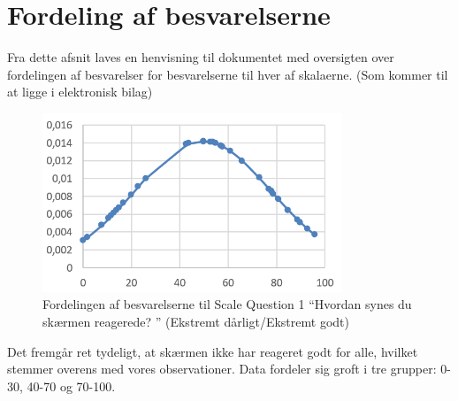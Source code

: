 \section{Fordeling af besvarelserne}
\label{TestAfSkalaFordelingAfBesvarelserne}
%
Fra dette afsnit laves en henvisning til dokumentet med oversigten over fordelingen af besvarelser for besvarelserne til hver af skalaerne. (Som kommer til at ligge i elektronisk bilag)
%
\begin{figure}[H]
\centering
\includegraphics[width = 0.8\textwidth]{Figure/DatabehandlingSkalaer/FordelingSkala1} 
\caption{Fordelingen af besvarelserne til Scale Question 1 ``Hvordan synes du skærmen reagerede? '' (Ekstremt dårligt/Ekstremt godt)}
\label{fig:FordelingSkala1}
\end{figure}
\noindent
%
Det fremgår ret tydeligt, at skærmen ikke har reageret godt for alle, hvilket stemmer overens med vores observationer. Data fordeler sig groft i tre grupper: 0-30, 40-70 og 70-100.


